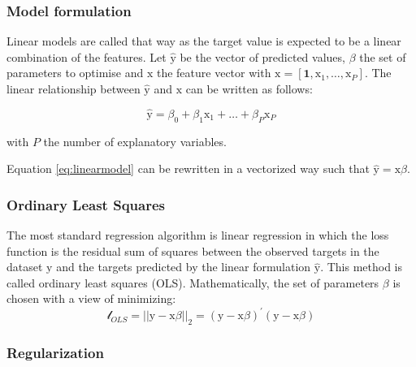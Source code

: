 \documentclass[
]{book}
\begin{document}
\hypertarget{model-formulation}{%
\subsubsection*{Model formulation}\label{model-formulation}}

Linear models are called that way as the target value is expected to be a linear combination of the features. Let \(\hat{\mathrm{y}}\) be the vector of predicted values, \(\beta\) the set of parameters to optimise and \(\pmb{\mathrm{x}}\) the feature vector with \(\pmb{\mathrm{x}} = [\pmb{1}, \mathrm{x}_1, \dots, \mathrm{x}_P]\). The linear relationship between \(\hat{\mathrm{y}}\) and \(\pmb{\mathrm{x}}\) can be written as follows:

\begin{equation}
  \hat{\mathrm{y}} = \beta_0 + \beta_1 \mathrm{x}_1 + \dots + \beta_P \mathrm{x}_P
  \label{eq:linearmodel}
\end{equation}

with \(P\) the number of explanatory variables.

Equation \eqref{eq:linearmodel} can be rewritten in a vectorized way such that \(\hat{\mathrm{y}} = \pmb{\mathrm{x}}\beta\).

\hypertarget{ordinary-least-squares}{%
\subsubsection*{Ordinary Least Squares}\label{ordinary-least-squares}}

The most standard regression algorithm is linear regression in which the loss function is the residual sum of squares between the observed targets in the dataset \(\mathrm{y}\) and the targets predicted by the linear formulation \(\hat{\mathrm{y}}\). This method is called ordinary least squares (OLS). Mathematically, the set of parameters \(\beta\) is chosen with a view of minimizing:
\begin{equation}
  \mathcal{l}_{OLS} = ||\mathrm{y} - \pmb{\mathrm{x}}\beta||_2 = (\mathrm{y} - \pmb{\mathrm{x}}\beta)^{'}(\mathrm{y} - \pmb{\mathrm{x}}\beta)
  \label{eq:ols}
\end{equation}

\hypertarget{regularization}{%
\subsubsection*{Regularization}\label{regularization}}
\end{document}
